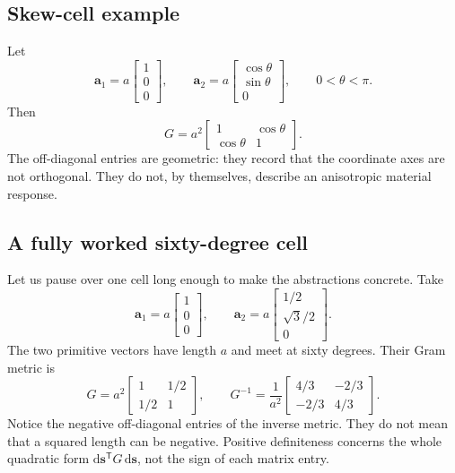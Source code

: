 \subsection{Skew-cell example}

Let
\begin{equation}
  \mathbf a_1=a
  \begin{bmatrix}1\\0\\0\end{bmatrix},
  \qquad
  \mathbf a_2=a
  \begin{bmatrix}\cos\theta\\\sin\theta\\0\end{bmatrix},
  \qquad 0<\theta<\pi.
  \label{eq:training-skew-basis}
\end{equation}
Then
\begin{equation}
  G=a^2
  \begin{bmatrix}
    1 & \cos\theta\\
    \cos\theta & 1
  \end{bmatrix}.
  \label{eq:training-skew-metric}
\end{equation}
The off-diagonal entries are geometric: they record that the coordinate axes
are not orthogonal. They do not, by themselves, describe an anisotropic
material response.

\subsection{A fully worked sixty-degree cell}

Let us pause over one cell long enough to make the abstractions concrete. Take
\begin{equation}
  \mathbf a_1=a
  \begin{bmatrix}1\\0\\0\end{bmatrix},
  \qquad
  \mathbf a_2=a
  \begin{bmatrix}1/2\\\sqrt{3}/2\\0\end{bmatrix}.
  \label{eq:training-sixty-degree-basis}
\end{equation}
The two primitive vectors have length $a$ and meet at sixty degrees. Their Gram
metric is
\begin{equation}
  G=a^2
  \begin{bmatrix}
    1 & 1/2\\
    1/2 & 1
  \end{bmatrix},
  \qquad
  G^{-1}=\frac{1}{a^2}
  \begin{bmatrix}
    4/3 & -2/3\\
    -2/3 & 4/3
  \end{bmatrix}.
  \label{eq:training-sixty-degree-metric}
\end{equation}
Notice the negative off-diagonal entries of the inverse metric. They do not
mean that a squared length can be negative. Positive definiteness concerns the
whole quadratic form
$\mathrm{d}\mathbf s^{\mathsf T}G\,\mathrm{d}\mathbf s$, not the sign of
each matrix entry.

